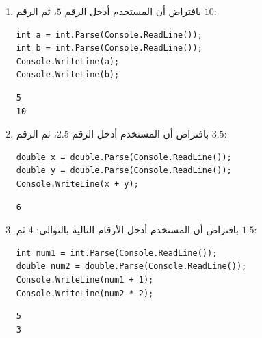 \documentclass[14pt]{extarticle}
\begin{document}
\begin{enumerate}[resume, itemsep=2em]

\item
بافتراض أن المستخدم أدخل الرقم $5$، ثم الرقم $10$:
\begin{english}
\begin{verbatim}
int a = int.Parse(Console.ReadLine());
int b = int.Parse(Console.ReadLine());
Console.WriteLine(a);
Console.WriteLine(b);
\end{verbatim}
\end{english}
\ifwithsols
\begin{boxSolution}
\begin{english}
\begin{verbatim}
5
10
\end{verbatim}
\end{english}
\end{boxSolution}
\fi

\item
بافتراض أن المستخدم أدخل الرقم $2.5$، ثم الرقم $3.5$:
\begin{english}
\begin{verbatim}
double x = double.Parse(Console.ReadLine());
double y = double.Parse(Console.ReadLine());
Console.WriteLine(x + y);
\end{verbatim}
\end{english}
\ifwithsols
\begin{boxSolution}
\begin{english}
\begin{verbatim}
6
\end{verbatim}
\end{english}
\end{boxSolution}
\fi

\item
بافتراض أن المستخدم أدخل الأرقام التالية بالتوالي: $4$ ثم $1.5$:
\begin{english}
\begin{verbatim}
int num1 = int.Parse(Console.ReadLine());
double num2 = double.Parse(Console.ReadLine());
Console.WriteLine(num1 + 1);
Console.WriteLine(num2 * 2);
\end{verbatim}
\end{english}
\ifwithsols
\begin{boxSolution}
\begin{english}
\begin{verbatim}
5
3
\end{verbatim}
\end{english}
\end{boxSolution}
\fi


\end{enumerate}
\end{document}
